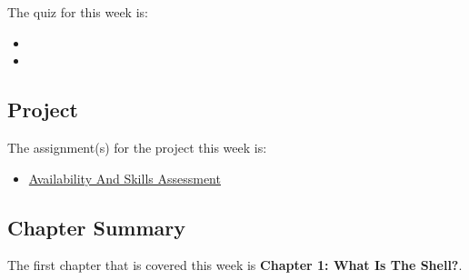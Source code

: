The quiz for this week is:

\begin{itemize}
    \item {}
    \item {}
\end{itemize}

\subsection{Project}

The assignment(s) for the project this week is:

\begin{itemize}
    \item \href{https://applied.cs.colorado.edu/mod/feedback/view.php?id=61251}{Availability And Skills Assessment}
\end{itemize}

\subsection{Chapter Summary}

The first chapter that is covered this week is \textbf{Chapter 1: What Is The Shell?}.

